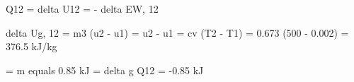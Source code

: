 Q12 = delta U12 = - delta EW, 12

delta Ug, 12 = m3 (u2 - u1) = u2 - u1 = cv (T2 - T1) = 0.673 (500 - 0.002) = 376.5 kJ/kg

= m equals 0.85 kJ = delta g
Q12 = -0.85 kJ
